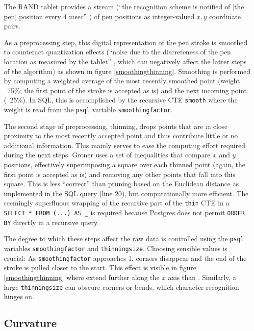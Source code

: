 \documentclass[sigconf]{acmart}
\begin{document}
The RAND tablet provides a stream (\enquote{the recognition scheme is notified of [the pen] position every 4 msec} \cite{groner}) of pen positions as integer-valued $x,y$ coordinate pairs.

As a preprocessing step, this digital representation of the pen stroke is smoothed to counteract quantization effects (\enquote{noise due to the discreteness of the pen location as measured by the tablet} \cite{groner}, which can negatively affect the latter steps of the algorithm) as shown in figure \ref{smoothingthinning}. Smoothing is performed by computing a weighted average of the most recently smoothed point (weight ~75\%; the first point of the stroke is accepted as is) and the next incoming point (~25\%). In SQL, this is accomplished by the recursive CTE \texttt{smooth} where the weight is read from the \texttt{psql} variable \texttt{smoothingfactor}.

The second stage of preprocessing, thinning, drops points that are in close proximity to the most recently accepted point and thus contribute little or no additional information. This mainly serves to ease the computing effort required during the next steps. Groner uses a set of inequalities that compare $x$ and $y$ positions, effectively superimposing a square over each thinned point (again, the first point is accepted as is) and removing any other points that fall into this square. This is less \enquote{correct} than pruning based on the Euclidean distance as implemented in the SQL query (line 20), but computationally more efficient. The seemingly superfluous wrapping of the recursive part of the \texttt{thin} CTE in a \texttt{SELECT * FROM (...) AS \_} is required because Postgres does not permit \texttt{ORDER BY} directly in a recursive query.

The degree to which these steps affect the raw data is controlled using the \texttt{psql} variables \texttt{smoothingfactor} and \texttt{thinningsize}. Choosing sensible values is crucial: As \texttt{smoothingfactor} approaches 1, corners disappear and the end of the stroke is pulled closer to the start. This effect is visible in figure \ref{smoothingthinning} where {\color[HTML]{BE7777}\huge\textbullet}{\color[HTML]{52B1C6}\huge\textbullet} extend further along the $x$ axis than {\color[HTML]{777777}\huge\textbullet}{\color[HTML]{74C974}\huge\textbullet}. Similarly, a large \texttt{thinningsize} can obscure corners or bends, which character recognition hinges on.

\subsection{Curvature}
\end{document}

